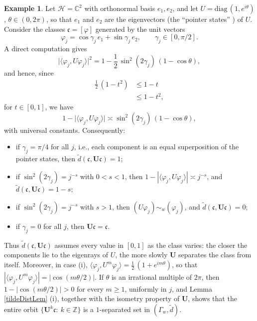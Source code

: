 \documentclass[twoside,11pt,letter]{article}
\def\bC{\mathbb{C}}
\def\bZ{\mathbb{Z}}
\def\cH{{\mathcal{H}}}
\def\fc{{\mathfrak{c}}}
\theoremstyle{definition}
\theoremstyle{definition}
\newtheorem{example}[theorem]{Example}
\theoremstyle{plain}
\begin{document}
\begin{example}\label{qubitEx}
Let $\cH=\bC^2$ with orthonormal basis $e_1,e_2$, and let $U=\mathrm{diag}\,(1,e^{i\theta})$, $\theta\in(0,2\pi)$, so that $e_1$ and $e_2$ are the eigenvectors (the ``pointer states'' \cite{Z03}) of $U$. Consider the classes $\fc=[\varphi]$ generated by the unit vectors
\begin{equation*}
\varphi_j=\cos\gamma_j\, e_1+\sin\gamma_j\, e_2,\qquad \gamma_j\in[0,\pi/2].
\end{equation*}
A direct computation gives
\begin{equation*}
\big|\langle\varphi_j,U\varphi_j\rangle\big|^2=1-\frac12\,\sin^2(2\gamma_j)\,(1-\cos\theta),
\end{equation*}
and hence, since 
\begin{equation*}
\begin{split}
\frac12\,(1-t^2)&\leq 1-t\\
&\leq 1-t^2,
\end{split}
\end{equation*}
for $t\in[0,1]$, we have
\begin{equation*}
1-\big|\langle\varphi_j,U\varphi_j\rangle\big|\asymp\sin^2(2\gamma_j)\,(1-\cos\theta),
\end{equation*}
with universal constants. Consequently:
\begin{itemize}
\item[(i)]{if $\gamma_j=\pi/4$ for all $j$, i.e., each component is an equal superposition of the pointer states, then $\tilde d(\fc,\mathbf{U}\fc)=1$;}
\item[(ii)]{if $\sin^2(2\gamma_j)=j^{-s}$ with $0<s<1$, then $1-|\langle\varphi_j,U\varphi_j\rangle|\asymp j^{-s}$, and $\tilde d(\fc,\mathbf{U}\fc)=1-s$;}
\item[(iii)]{if $\sin^2(2\gamma_j)=j^{-s}$ with $s>1$, then $(U\varphi_j)\sim_w(\varphi_j)$, and $\tilde d(\fc,\mathbf{U}\fc)=0$;}
\item[(iv)]{if $\gamma_j=0$ for all $j$, then $\mathbf{U}\fc=\fc$.}
\end{itemize}
Thus $\tilde d(\fc,\mathbf{U}\fc)$ assumes every value in $[0,1]$ as the class varies: the closer the components lie to the eigenrays of $U$, the more slowly $\mathbf{U}$ separates the class from itself. Moreover, in case (i), $\langle\varphi_j,U^m\varphi_j\rangle=\frac12\,(1+e^{im\theta})$, so that $|\langle\varphi_j,U^m\varphi_j\rangle|=|\cos(m\theta/2)|$. If $\theta$ is an irrational multiple of $2\pi$, then $1-|\cos(m\theta/2)|>0$ for every $m\geq1$, uniformly in $j$, and Lemma \ref{tildeDistLem} (i), together with the isometry property of $\mathbf{U}$, shows that the entire orbit $\{\mathbf{U}^k\fc:\:k\in\bZ\}$ is a $1$-separated set in $(\Gamma_w,\tilde d)$.
\end{example}
\end{document}
